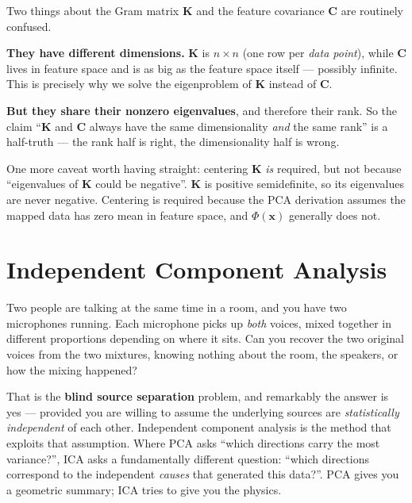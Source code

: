 \documentclass[11pt, oneside]{book}
\begin{document}
\begin{notebox}[title={$\bm{K}$ and $\bm{C}$: same rank, different size}]
Two things about the Gram matrix $\bm{K}$ and the feature covariance $\bm{C}$ are
routinely confused.

\textbf{They have different dimensions.}
$\bm{K}$ is $n\times n$ (one row per \emph{data point}), while $\bm{C}$ lives in
feature space and is as big as the feature space itself --- possibly infinite.
This is precisely why we solve the eigenproblem of $\bm{K}$ instead of $\bm{C}$.

\textbf{But they share their nonzero eigenvalues}, and therefore their rank.
So the claim ``$\bm{K}$ and $\bm{C}$ always have the same dimensionality
\emph{and} the same rank'' is a half-truth --- the rank half is right, the
dimensionality half is wrong.

One more caveat worth having straight: centering $\bm{K}$ \emph{is} required, but
not because ``eigenvalues of $\bm{K}$ could be negative''.
$\bm{K}$ is positive semidefinite, so its eigenvalues are never negative.
Centering is required because the PCA derivation assumes the mapped data has zero
mean in feature space, and $\Phi(\bm{x})$ generally does not.
\end{notebox}


\chapter{Independent Component Analysis}

Two people are talking at the same time in a room, and you have two microphones
running.
Each microphone picks up \emph{both} voices, mixed together in different
proportions depending on where it sits.
Can you recover the two original voices from the two mixtures, knowing nothing
about the room, the speakers, or how the mixing happened?

That is the \textbf{blind source separation} problem, and remarkably the answer
is yes --- provided you are willing to assume the underlying sources are
\emph{statistically independent} of each other.
Independent component analysis is the method that exploits that assumption.
Where PCA asks ``which directions carry the most variance?'', ICA asks a
fundamentally different question: ``which directions correspond to the
independent \emph{causes} that generated this data?''.
PCA gives you a geometric summary; ICA tries to give you the physics.
\end{document}
